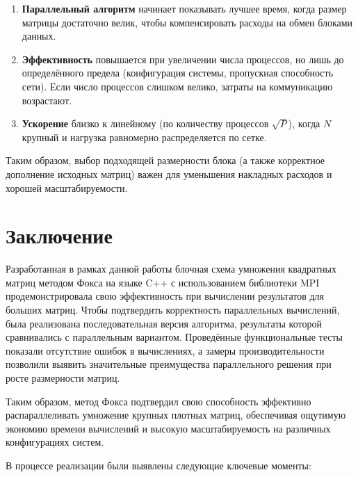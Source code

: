 \documentclass{report}
\begin{document}
\begin{enumerate}
    \item \textbf{Параллельный алгоритм} начинает показывать лучшее время, когда размер матрицы достаточно велик, чтобы компенсировать расходы на обмен блоками данных.
    
    \item \textbf{Эффективность} повышается при увеличении числа процессов, но лишь до определённого предела (конфигурация системы, пропускная способность сети). Если число процессов слишком велико, затраты на коммуникацию возрастают.
    
    \item \textbf{Ускорение} близко к линейному (по количеству процессов $\sqrt{P}$), когда $N$ крупный и нагрузка равномерно распределяется по сетке.  
\end{enumerate}

Таким образом, выбор подходящей размерности блока (а также корректное дополнение исходных матриц) важен для уменьшения накладных расходов и хорошей масштабируемости.

\newpage

\section*{Заключение}

Разработанная в рамках данной работы блочная схема умножения квадратных матриц методом Фокса на языке C++ с использованием библиотеки MPI продемонстрировала свою эффективность при вычислении результатов для больших матриц. Чтобы подтвердить корректность параллельных вычислений, была реализована последовательная версия алгоритма, результаты которой сравнивались с параллельным вариантом. Проведённые функциональные тесты показали отсутствие ошибок в вычислениях, а замеры производительности позволили выявить значительные преимущества параллельного решения при росте размерности матриц.

Таким образом, метод Фокса подтвердил свою способность эффективно распараллеливать умножение крупных плотных матриц, обеспечивая ощутимую экономию времени вычислений и высокую масштабируемость на различных конфигурациях систем.

В процессе реализации были выявлены следующие ключевые моменты:
\end{document}

